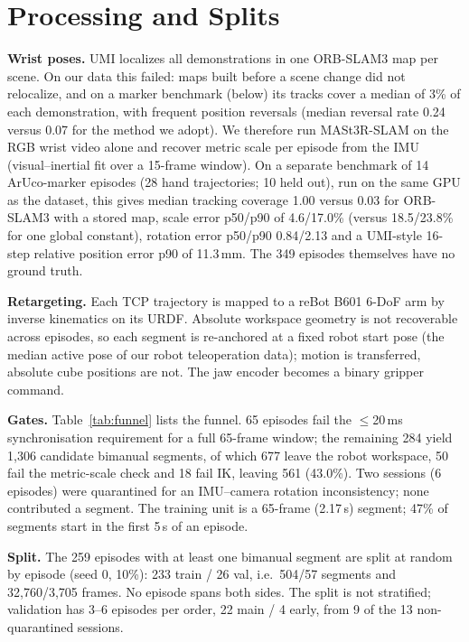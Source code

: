 \documentclass[conference,10pt]{IEEEtran}
\newcommand{\mm}{\,mm\xspace}
\begin{document}
\section{Processing and Splits}\label{sec:proc}
\textbf{Wrist poses.} UMI localizes all demonstrations in one ORB-SLAM3 map per scene. On our data this failed: maps built
before a scene change did not relocalize, and on a marker benchmark (below) its tracks cover a median of 3\% of each demonstration, with frequent position
reversals (median reversal rate 0.24 versus 0.07 for the method we adopt). We therefore run MASt3R-SLAM on the RGB wrist video alone and recover metric scale
per episode from the IMU (visual--inertial fit over a 15-frame window). On a separate benchmark of 14 ArUco-marker episodes
(28 hand trajectories; 10 held out), run on the same GPU as the dataset, this gives median tracking coverage 1.00 versus 0.03
for ORB-SLAM3 with a stored map, scale error p50/p90 of 4.6/17.0\% (versus 18.5/23.8\% for one global constant), rotation error p50/p90 0.84/2.13\textdegree{} and a UMI-style 16-step relative
position error p90 of 11.3\mm. The 349 episodes themselves have no ground truth.

\textbf{Retargeting.} Each TCP trajectory is mapped to a reBot B601 6-DoF arm by inverse kinematics on its URDF. Absolute
workspace geometry is not recoverable across episodes, so each segment is re-anchored at a fixed robot start pose (the median
active pose of our robot teleoperation data); motion is transferred, absolute cube positions are not. The jaw encoder becomes a
binary gripper command.

\textbf{Gates.} Table~\ref{tab:funnel} lists the funnel. 65 episodes fail the $\le$20\,ms synchronisation requirement for a full
65-frame window; the remaining 284 yield 1{,}306 candidate bimanual segments, of which 677 leave the robot workspace, 50 fail the
metric-scale check and 18 fail IK, leaving 561 (43.0\%). Two sessions (6 episodes) were quarantined for an IMU--camera
rotation inconsistency; none contributed a segment. The training unit is a 65-frame (2.17\,s) segment; 47\% of segments start
in the first 5\,s of an episode.

\textbf{Split.} The 259 episodes with at least one bimanual segment are split at random by episode (seed 0, 10\%): 233 train /
26 val, i.e.\ 504/57 segments and 32{,}760/3{,}705 frames. No episode spans both sides. The split is not stratified; validation
has 3--6 episodes per order, 22 main / 4 early, from 9 of the 13 non-quarantined sessions.
\end{document}
